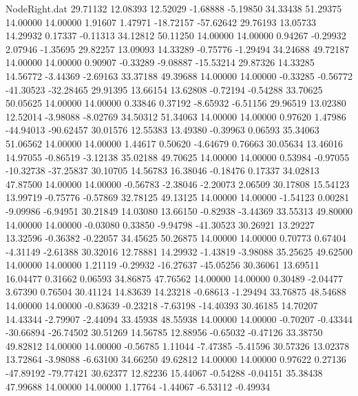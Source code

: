 \begin{filecontents}{NodeRight.dat}
  29.71132   12.08393   12.52029    -1.68888   -5.19850   34.33438   51.29375   14.00000   14.00000    1.91607    1.47971  -18.72157  -57.62642
  29.76193   13.05733   14.29932     0.17337   -0.11313   34.12812   50.11250   14.00000   14.00000    0.94267   -0.29932    2.07946   -1.35695
  29.82257   13.09093   14.33289    -0.75776   -1.29494   34.24688   49.72187   14.00000   14.00000    0.90907   -0.33289   -9.08887  -15.53214
  29.87326   14.33285   14.56772    -3.44369   -2.69163   33.37188   49.39688   14.00000   14.00000   -0.33285   -0.56772  -41.30523  -32.28465
  29.91395   13.66154   13.62808    -0.72194   -0.54288   33.70625   50.05625   14.00000   14.00000    0.33846    0.37192   -8.65932   -6.51156
  29.96519   13.02380   12.52014    -3.98088   -8.02769   34.50312   51.34063   14.00000   14.00000    0.97620    1.47986  -44.94013  -90.62457
  30.01576   12.55383   13.49380    -0.39963    0.06593   35.34063   51.06562   14.00000   14.00000    1.44617    0.50620   -4.64679    0.76663
  30.05634   13.46016   14.97055    -0.86519   -3.12138   35.02188   49.70625   14.00000   14.00000    0.53984   -0.97055  -10.32738  -37.25837
  30.10705   14.56783   16.38046    -0.18476    0.17337   34.02813   47.87500   14.00000   14.00000   -0.56783   -2.38046   -2.20073    2.06509
  30.17808   15.54123   13.99719    -0.75776   -0.57869   32.78125   49.13125   14.00000   14.00000   -1.54123    0.00281   -9.09986   -6.94951
  30.21849   14.03080   13.66150    -0.82938   -3.44369   33.55313   49.80000   14.00000   14.00000   -0.03080    0.33850   -9.94798  -41.30523
  30.26921   13.29227   13.32596    -0.36382   -0.22057   34.45625   50.26875   14.00000   14.00000    0.70773    0.67404   -4.31149   -2.61388
  30.32016   12.78881   14.29932    -1.43819   -3.98088   35.25625   49.62500   14.00000   14.00000    1.21119   -0.29932  -16.27637  -45.05256
  30.36061   13.69511   16.04477     0.31662    0.06593   34.86875   47.76562   14.00000   14.00000    0.30489   -2.04477    3.67390    0.76504
  30.41124   14.83639   14.23218    -0.68613   -1.29494   33.76875   48.54688   14.00000   14.00000   -0.83639   -0.23218   -7.63198  -14.40393
  30.46185   14.70207   14.43344    -2.79907   -2.44094   33.45938   48.55938   14.00000   14.00000   -0.70207   -0.43344  -30.66894  -26.74502
  30.51269   14.56785   12.88956    -0.65032   -0.47126   33.38750   49.82812   14.00000   14.00000   -0.56785    1.11044   -7.47385   -5.41596
  30.57326   13.02378   13.72864    -3.98088   -6.63100   34.66250   49.62812   14.00000   14.00000    0.97622    0.27136  -47.89192  -79.77421
  30.62377   12.82236   15.44067    -0.54288   -0.04151   35.38438   47.99688   14.00000   14.00000    1.17764   -1.44067   -6.53112   -0.49934

\end{filecontents}
